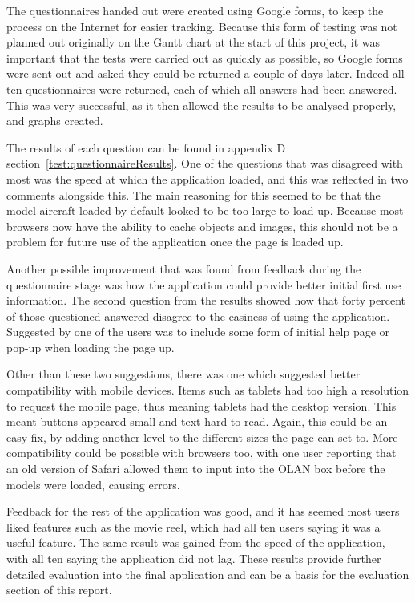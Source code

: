 The questionnaires handed out were created using Google forms, to keep the process on the Internet for easier tracking. Because this form of testing was not planned out originally on the Gantt chart at the start of this project, it was important that the tests were carried out as quickly as possible, so Google forms were sent out and asked they could be returned a couple of days later. Indeed all ten questionnaires were returned, each of which all answers had been answered. This was very successful, as it then allowed the results to be analysed properly, and graphs created.

The results of each question can be found in appendix D section~\ref{test:questionnaireResults}. One of the questions that was disagreed with most was the speed at which the application loaded, and this was reflected in two comments alongside this. The main reasoning for this seemed to be that the model aircraft loaded by default looked to be too large to load up. Because most browsers now have the ability to cache objects and images, this should not be a problem for future use of the application once the page is loaded up.

Another possible improvement that was found from feedback during the questionnaire stage was how the application could provide better initial first use information. The second question from the results showed how that forty percent of those questioned answered disagree to the easiness of using the application. Suggested by one of the users was to include some form of initial help page or pop-up when loading the page up. 

Other than these two suggestions, there was one which suggested better compatibility with mobile devices. Items such as tablets had too high a resolution to request the mobile page, thus meaning tablets had the desktop version. This meant buttons appeared small and text hard to read. Again, this could be an easy fix, by adding another level to the different sizes the page can set to. More compatibility could be possible with browsers too, with one user reporting that an old version of Safari allowed them to input into the OLAN box before the models were loaded, causing errors. 

Feedback for the rest of the application was good, and it has seemed most users liked features such as the movie reel, which had all ten users saying it was a useful feature. The same result was gained from the speed of the application, with all ten saying the application did not lag. These results provide further detailed evaluation into the final application and can be a basis for the evaluation section of this report.

